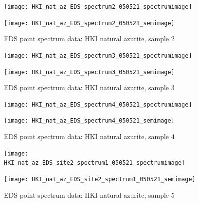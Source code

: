 \begin{figure}[H]
\centering
\begin{minipage}{.45\textwidth}
  \centering
  \texttt{[image: HKI\_nat\_az\_EDS\_spectrum2\_050521\_spectrumimage]}
\end{minipage}
\begin{minipage}{.45\textwidth}
  \centering
  \texttt{[image: HKI\_nat\_az\_EDS\_spectrum2\_050521\_semimage]}
\end{minipage}
\caption[EDS point spectrum data: HKI natural azurite, sample 2]{EDS point spectrum data: HKI natural azurite, sample 2}
\label{fig:hki_point_eds_2}
\end{figure}

\begin{figure}[H]
\centering
\begin{minipage}{.45\textwidth}
  \centering
  \texttt{[image: HKI\_nat\_az\_EDS\_spectrum3\_050521\_spectrumimage]}
\end{minipage}
\begin{minipage}{.45\textwidth}
  \centering
  \texttt{[image: HKI\_nat\_az\_EDS\_spectrum3\_050521\_semimage]}
\end{minipage}
\caption[EDS point spectrum data: HKI natural azurite, sample 3]{EDS point spectrum data: HKI natural azurite, sample 3}
\label{fig:hki_point_eds_3}
\end{figure}

\begin{figure}[H]
\centering
\begin{minipage}{.45\textwidth}
  \centering
  \texttt{[image: HKI\_nat\_az\_EDS\_spectrum4\_050521\_spectrumimage]}
\end{minipage}
\begin{minipage}{.45\textwidth}
  \centering
  \texttt{[image: HKI\_nat\_az\_EDS\_spectrum4\_050521\_semimage]}
\end{minipage}
\caption[EDS point spectrum data: HKI natural azurite, sample 4]{EDS point spectrum data: HKI natural azurite, sample 4}
\label{fig:hki_point_eds_4}
\end{figure}

\begin{figure}[H]
\centering
\begin{minipage}{.45\textwidth}
  \centering
  \texttt{[image: HKI\_nat\_az\_EDS\_site2\_spectrum1\_050521\_spectrumimage]}
\end{minipage}
\begin{minipage}{.45\textwidth}
  \centering
  \texttt{[image: HKI\_nat\_az\_EDS\_site2\_spectrum1\_050521\_semimage]}
\end{minipage}
\caption[EDS point spectrum data: HKI natural azurite, sample 5]{EDS point spectrum data: HKI natural azurite, sample 5}
\label{fig:hki_point_eds_5}
\end{figure}

